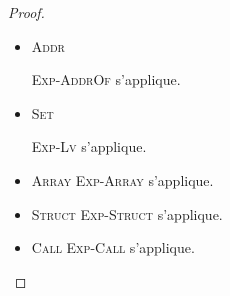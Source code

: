 \begin{proof}
\begin{itemize}
  \item \textsc{Addr}

    \textsc{Exp-AddrOf} s'applique.

  \item \textsc{Set}

    \textsc{Exp-Lv} s'applique.

  \item \textsc{Array}
    \textsc{Exp-Array} s'applique.

  \item \textsc{Struct}
    \textsc{Exp-Struct} s'applique.

  \item \textsc{Call}
    \textsc{Exp-Call} s'applique.

\end{itemize}

\end{proof}

